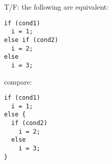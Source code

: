 \begin{review}
  T/F: the following are equivalent:
  \begin{multicols}{2}
\begin{lstlisting}
if (cond1)
  i = 1;
else if (cond2)
  i = 2;
else
  i = 3;
\end{lstlisting}
\columnbreak
compare:
\begin{lstlisting}
if (cond1)
  i = 1;
else {
  if (cond2)
    i = 2;
  else
    i = 3;
}
\end{lstlisting}
\end{multicols}
\end{review}
